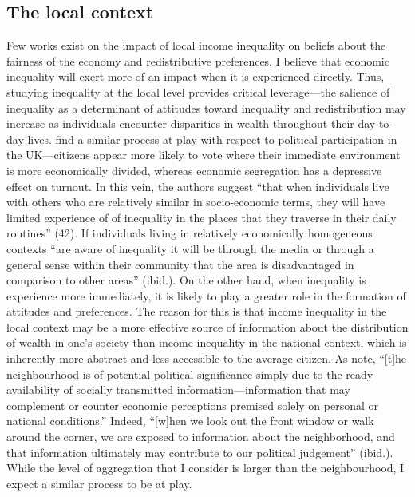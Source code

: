 \documentclass[12pt, letter]{scrartcl}
\begin{document}
\vspace{15pt}
\singlespacing
\subsection{The local context}
\doublespacing

Few works exist on the impact of local income inequality on beliefs about the fairness of the economy and redistributive preferences. I believe that economic inequality will exert more of an impact when it is experienced directly. Thus, studying inequality at the local level provides critical leverage---the salience of inequality as a determinant of attitudes toward inequality and redistribution may increase as individuals encounter disparities in wealth throughout their day-to-day lives. \textcite{bartle2017local} find a similar process at play with respect to political participation in the UK---citizens appear more likely to vote where their immediate environment is more economically divided, whereas economic segregation has a depressive effect on turnout. In this vein, the authors suggest ``that when individuals live with others who are relatively similar in socio-economic terms, they will have limited experience of of inequality in the places that they traverse in their daily routines'' (42). If individuals living in relatively economically homogeneous contexts ``are aware of inequality it will be through the media or through a general sense within their community that the area is disadvantaged in comparison to other areas'' (ibid.). On the other hand, when inequality is experience more immediately, it is likely to play a greater role in the formation of attitudes and preferences. The reason for this is that income inequality in the local context may be a more effective source of information about the distribution of wealth in one's society than income inequality in the national context, which is inherently more abstract and less accessible to the average citizen. As \textcite[250]{mondak2000persuasion} note, ``[t]he neighbourhood is of potential political significance simply due to the ready availability of socially transmitted information---information that may complement or counter economic perceptions premised solely on personal or national conditions.'' Indeed, ``[w]hen we look out the front window or walk around the corner, we are exposed to information about the neighborhood, and that information ultimately may contribute to our political judgement'' (ibid.). While the level of aggregation that I consider is larger than the neighbourhood, I expect a similar process to be at play.
\end{document}
